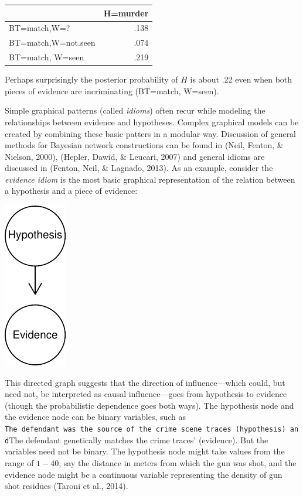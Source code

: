 \documentclass[11pt,dvipsnames,enabledeprecatedfontcommands]{scrartcl}
\begin{document}
\begin{table}[H]
\centering
\begin{tabular}{lr}
\toprule
  & H=murder\\
\midrule
BT=match,W=? & .138\\
BT=match,W=not.seen & .074\\
BT=match, W=seen & .219\\
\bottomrule
\end{tabular}
\end{table}

\noindent Perhaps surprisingly the posterior probability of \(H\) is
about .22 even when both pieces of evidence are incriminating (BT=match,
W=seen).

Simple graphical patterns (called \emph{idioms}) often recur while
modeling the relationships between evidence and hypotheses. Complex
graphical models can be created by combining these basic patters in a
modular way. Discussion of general methods for Bayesian network
constructions can be found in (Neil, Fenton, \& Nielson, 2000), (Hepler,
Dawid, \& Leucari, 2007) and general idioms are discussed in (Fenton,
Neil, \& Lagnado, 2013). As an example, consider the
\emph{evidence idiom} is the most basic graphical representation of the
relation between a hypothesis and a piece of evidence:

\begin{center}\includegraphics{BNfiles/unnamed-chunk-6-1} \end{center}

\noindent  This directed graph suggests that the direction of
influence---which could, but need not, be interpreted as causal
influence---goes from hypothesis to evidence (though the probabilistic
dependence goes both ways). The hypothesis node and the evidence node
can be binary variables, such as
\texttt{The\ defendant\ was\ the\ source\ of\ the\ crime\ scene\ traces\textquotesingle{}\ (hypothesis)\ and}The
defendant genetically matches the crime traces' (evidence). But the
variables need not be binary. The hypothesis node might take values from
the range of \(1-40\), say the distance in meters from which the gun was
shot, and the evidence node might be a continuous variable representing
the density of gun shot residues (Taroni et al., 2014).
\end{document}

